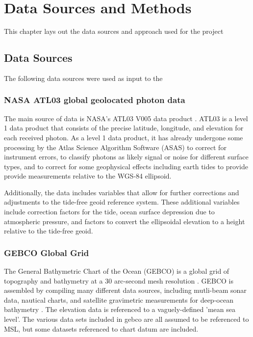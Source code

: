 \chapter{Data Sources and Methods}\label{sec:methodology}
This chapter lays out the data sources and approach used for the project
\section{Data Sources}
The following data sources were used as input to the 
\subsection{NASA ATL03 global geolocated photon data}

The main source of data is NASA's ATL03 V005 data product \parencite{icesat2data}. ATL03 is a level 1 data product that consists of the precise latitude, longitude, and elevation for each received photon. As a level 1 data product, it has already undergone some processing by the Atlas Science Algorithm Software (ASAS) to correct for instrument errors, to classify photons as likely signal or noise for different surface types, and to correct for some geophysical effects including earth tides to provide provide measurements relative to the WGS-84 ellipsoid. 

Additionally, the data includes variables that allow for further corrections and adjustments to the tide-free geoid reference system. These additional variables include correction factors for the tide, ocean surface depression due to atmospheric pressure, and factors to convert the ellipsoidal elevation to a height relative to the tide-free geoid.

\subsection{GEBCO Global Grid}

The General Bathymetric Chart of the Ocean (GEBCO) is a global grid of topography and bathymetry at a 30 arc-second mesh resolution \parencite{gebco2021griddata}. GEBCO is assembled by compiling many different data sources, including mutli-beam sonar data, nautical charts, and satellite gravimetric measurements for deep-ocean bathymetry \parencite{gebcocookbook}. The elevation data is referenced to a vaguely-defined 'mean sea level'. The various data sets included in gebco are all assumed to be referenced to MSL, but some datasets referenced to chart datum are included. 

